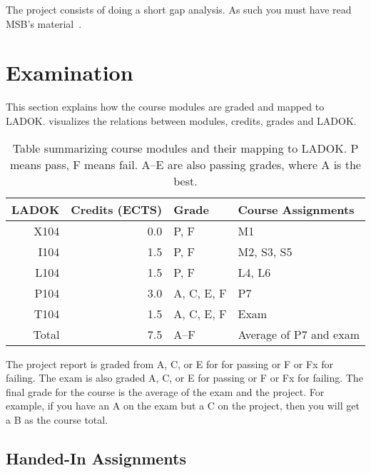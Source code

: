 The project consists of doing a short gap analysis.
As such you must have read MSB's material~\cite{%
  MSB2011itm,MSB2011sle,MSB2011p,MSB2011v,MSB2011r,%
  MSB2011gap,MSB2011vs,MSB2011us,MSB2011upo,%
	MSB2011pg,MSB2011koa,MSB2011i,MSB2011o,MSB2011g,%
	MSB2011lg,MSB2011ulo,MSB2011kf,MSB2011fa%
}.


\section{Examination}
\label{Examination}

This section explains how the course modules are graded and mapped to LADOK\@.
 visualizes the relations between modules, credits, grades and 
LADOK\@.

\begin{table}
  \centering
  \caption{%
    Table summarizing course modules and their mapping to LADOK\@.
    P means pass, F means fail.
    A--E are also passing grades, where A is the best.
  }\label{LADOKTable}
  \begin{tabular}{rrll}
    \toprule
    LADOK & Credits (ECTS)  & Grade       & Course Assignments\\
    \midrule
    X104  & 0.0             & P, F        & M1\\
    I104  & 1.5             & P, F        & M2, S3, S5\\
    L104  & 1.5             & P, F        & L4, L6\\
    P104  & 3.0             & A, C, E, F  & P7\\
    T104  & 1.5             & A, C, E, F  & Exam\\
    \midrule
    Total & 7.5             & A--F        & Average of P7 and exam\\
    \bottomrule
  \end{tabular}
\end{table}

The project report is graded from A, C, or E for for passing or F or Fx for 
failing.
The exam is also graded A, C, or E for passing or F or Fx for failing.
The final grade for the course is the average of the exam and the project.
For example, if you have an A on the exam but a C on the project, then you will 
get a B as the course total.

\subsection{Handed-In Assignments}


